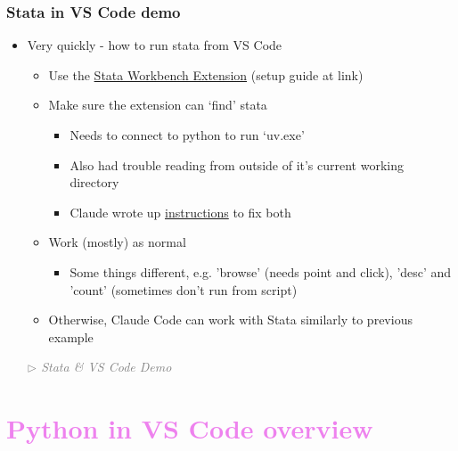 \documentclass[aspectratio=169, 12pt]{beamer}
\newcommand{\ghLtwo}{https://tannerregan.github.io/GWU_AI_study_group/code/lecture_2/}
\begin{document}
\begin{frame}
\frametitle{Stata in VS Code demo}

\begin{itemize}
    \item Very quickly - how to run stata from VS Code
    \begin{itemize}
        \item Use the \href{https://github.com/tmonk/stata-workbench}{Stata Workbench Extension} (setup guide at link)
        \item Make sure the extension can `find' stata 
        \begin{itemize}
            \item Needs to connect to python to run `uv.exe'
            \item Also had trouble reading from outside of it's current working directory
            \item Claude wrote up \href{\ghLtwo/stata_vscode_demo/mcp_stata_fix.md}{instructions}  to fix both
        \end{itemize}
        \item Work (mostly) as normal
        \begin{itemize}
            \item Some things different, e.g. 'browse' (needs point and click), 'desc' and 'count' (sometimes don't run from script)
        \end{itemize}
    \item Otherwise, Claude Code can work with Stata similarly to previous example
    \end{itemize}
    \textcolor{gray}{\textit{$\triangleright$ Stata \& VS Code Demo}}
\end{itemize}

\end{frame}



\section{\textcolor{violet}{Python in VS Code overview \vspace{0.3in}}}
\end{document}
